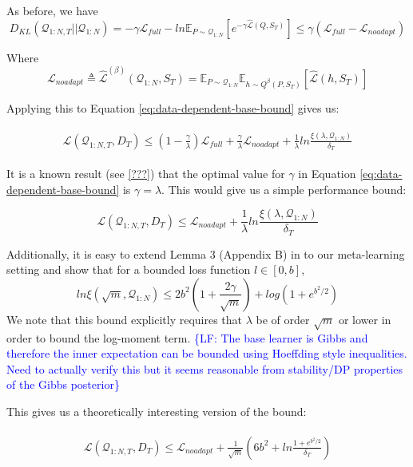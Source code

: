 \documentclass{article}
\theoremstyle{definition}
\newcommand{\Expect}[2]{\mathbb{E}_{#1}\left [#2 \right ]}
\newcommand{\LF}[1]{\textcolor{blue}{\{LF: #1\}}}
\begin{document}
As before, we have 
$$D_{KL}(\mathcal{Q}_{1:N,T}||\mathcal{Q}_{1:N}) = -\gamma \mathcal{L}_{full} -ln\Expect{P\sim \mathcal{Q}_{1:N}}{e^{-\gamma\hat{\mathcal{L}}(Q,S_T)}}\leq \gamma (\mathcal{L}_{full}-\mathcal{L}_{noadapt})$$

Where $$\mathcal{L}_{noadapt}\triangleq \hat{\mathcal{L}}^{(\beta)}(\mathcal{Q}_{1:N}, S_T)=\mathbb{E}_{P\sim \mathcal{Q}_{1:N}}\mathbb{E}_{h\sim Q^{\beta}(P,S_T)}\left [\hat{\mathcal{L}}(h, S_T)\right ]$$

Applying this to Equation \ref{eq:data-dependent-base-bound} gives us:

\begin{align} \label{eq:data-dependent-clear-bound}
\begin{split}
\mathcal{L}(\mathcal{Q}_{1:N,T}, D_T) \leq (1-\frac{\gamma}{\lambda})\mathcal{L}_{full} + \frac{\gamma}{\lambda}\mathcal{L}_{noadapt} + \frac{1}{\lambda}ln\frac{\xi(\lambda,\mathcal{Q}_{1:N})}{\delta_T}
\end{split}
\end{align}

It is a known result (see \ref{???}) that the optimal value for $\gamma$ in Equation \ref{eq:data-dependent-base-bound} is $\gamma=\lambda$. This would give us a simple performance bound:

$$\mathcal{L}(\mathcal{Q}_{1:N,T}, D_T) \leq \mathcal{L}_{noadapt} + \frac{1}{\lambda}ln\frac{\xi(\lambda,\mathcal{Q}_{1:N})}{\delta_T}$$

Additionally, it is easy to extend Lemma 3 (Appendix B) in \citet{Rivasplata2020} to our meta-learning setting and show that for a bounded loss function $l\in [0, b]$,
$$ln\xi(\sqrt{m},\mathcal{Q}_{1:N}) \leq 2b^2(1+\frac{2\gamma}{\sqrt{m}})+log(1+e^{b^2/2})$$
We note that this bound explicitly requires that $\lambda$ be of order $\sqrt{m}$ or lower in order to bound the log-moment term.
\LF{The base learner is Gibbs and therefore the inner expectation can be bounded using Hoeffding style inequalities. Need to actually verify this but it seems reasonable from stability/DP properties of the Gibbs posterior}

This gives us a theoretically interesting version of the bound:

\begin{align} \label{eq:data-dependent-simplified-bound}
\begin{split}
\mathcal{L}(\mathcal{Q}_{1:N,T}, D_T) \leq \mathcal{L}_{noadapt} + \frac{1}{\sqrt{m}}\left (6b^2+ln\frac{1+e^{b^2/2}}{\delta_T}\right )
\end{split}
\end{align}
\end{document}
